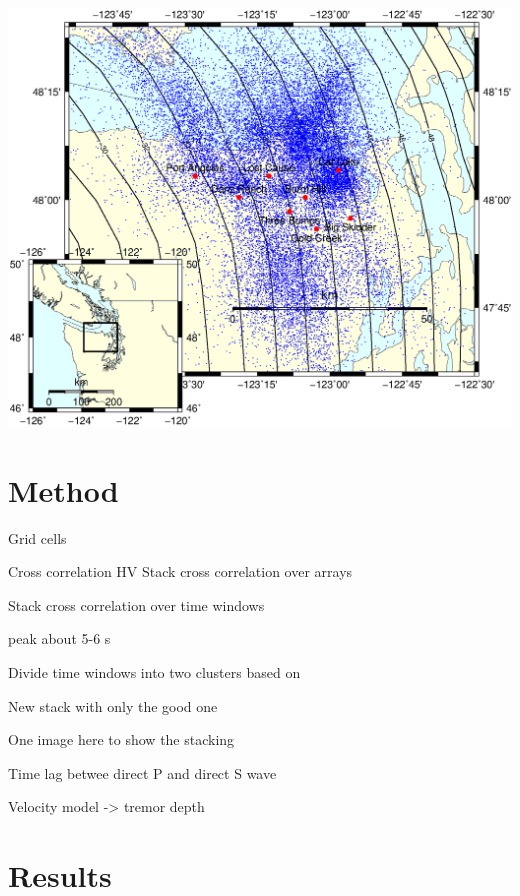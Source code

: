 \documentclass[main.tex]{subfiles}
\begin{document}
\begin{center}
\includegraphics[width=19cm, trim={0cm 2.5cm 0cm 9.5cm},clip]{Figures/timelags/arrays_location.eps}
\captionsetup{type=figure}
\end{center}

\chapter{Method}

Grid cells

Cross correlation HV
Stack cross correlation over arrays

Stack cross correlation over time windows

peak about 5-6 s

Divide time windows into two clusters based on

New stack with only the good one

One image here to show the stacking

Time lag betwee direct P and direct S wave

Velocity model -> tremor depth

\chapter{Results}
\end{document}
